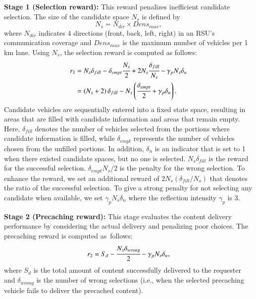 \documentclass{aims}
\numberwithin{equation}{section}
\begin{document}
\textbf{Stage 1 (Selection reward):}
This reward penalizes inefficient candidate selection.
The size of the candidate space $N_{s}$ is defined by
\begin{equation}
    N_{s}= N_{dir} \times Dens_{max},
\end{equation}
where $N_{dir}$ indicates 4 directions (front, back, left, right) in an RSU's communication coverage and $Dens_{max}$ is the maximum number of vehicles per 1 km lane.
Using $N_{s}$, the selection reward is computed as follows:
\begin{equation}
\begin{split}
    r_{1} &= N_{s} \delta_{fill} - \delta_{empt}\cfrac{N_{s}}{2}
            + 2N_{s} \cfrac{\delta_{fill}}{N_{s}} - \gamma_{p} N_{s} \delta_{n}\\
          &= \left(N_{s}+2\right)\delta_{fill}-N_{s}\left(\cfrac{\delta_{empt}}{2}+\gamma_{p}\delta_{n}\right).
\end{split}
\end{equation}
Candidate vehicles are sequentially entered into a fixed state space, resulting in areas that are filled with candidate information and areas that remain empty.
Here, $\delta_{fill}$ denotes the number of vehicles selected from the portions where candidate information is filled, while $\delta_{empt}$ represents the number of vehicles chosen from the unfilled portions.
In addition, $\delta_{n}$ is an indicator that is set to 1 when there existed candidate spaces, but no one is selected.
$N_{s} \delta_{fill}$ is the reward for the successful selection.
$\delta_{empt}N_{s}/2$ is the penalty for the wrong selection.
To enhance the reward, we set an additional reward of $2N_{s} (\delta_{fill}/N_{s})$ that denotes the ratio of the successful selection.
To give a strong penalty for not selecting any candidate when available, we set $\gamma_{p} N_{s} \delta_{n}$ where the reflection intensity $\gamma_{p}$ is 3.

\textbf{Stage 2 (Precaching reward):}
This stage evaluates the content delivery performance by considering the actual delivery and penalizing poor choices.
The precaching reward is computed as~follows:
\begin{equation}
    r_{2} = S_{d} - \cfrac{N_{s}\delta_{wrong}}{2}-\gamma_{p}N_{s}\delta_{n},
\end{equation}
where $S_{d}$ is the total amount of content successfully delivered to the requester and $\delta_{wrong}$ is the number of wrong selections (i.e., when the selected precaching vehicle fails to deliver the precached content).
\end{document}
